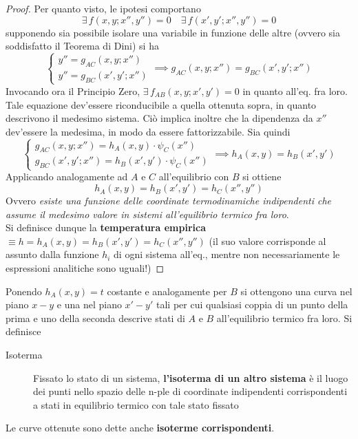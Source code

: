 \documentclass[10pt, oneside]{book}
\begin{document}
\begin{proof}
Per quanto visto, le ipotesi comportano
\[\exists \, f(x,y; x'', y'') = 0 \quad \exists \, f(x', y'; x'', y'') = 0\]
supponendo sia possibile isolare una variabile in funzione delle altre (ovvero sia soddisfatto il Teorema di Dini) si ha
\[\displaystyle \begin{cases} y'' = g_{AC} (x,y; x'') \\ y'' = g_{BC} (x', y'; x'') \end{cases} \implies g_{AC} (x,y; x'') = g_{BC} (x', y'; x'')\]
Invocando ora il Principio Zero, $\displaystyle \exists \, f_{AB}(x,y;x',y') = 0$ in 	quanto all'eq. fra loro. Tale equazione dev'essere riconducibile a quella ottenuta sopra, in quanto descrivono il medesimo sistema. Ciò implica inoltre che la dipendenza da $x''$ dev'essere la medesima, in modo da essere fattorizzabile. Sia quindi
\[\begin{cases} g_{AC} (x, y; x'') = h_A (x,y) \cdot \psi_C (x'') \\ g_{BC} (x', y'; x'') = h_B(x',y') \cdot \psi_C (x'') \end{cases} \implies h_A(x,y) = h_B(x',y')\]
Applicando analogamente ad $A$ e $C$ all'equilibrio con $B$ si ottiene
\[h_A(x,y) = h_B(x',y') = h_C (x'', y'')\]
Ovvero \textit{esiste una funzione delle coordinate termodinamiche indipendenti che assume il medesimo valore in sistemi all'equilibrio termico fra loro}.
\\Si definisce dunque la \textbf{temperatura empirica} $\displaystyle \equiv h = h_A(x,y) = h_B(x',y') = h_C (x'', y'')$ (il suo valore corrisponde al  assunto dalla funzione $h_i$ di ogni sistema all'eq., mentre non necessariamente le espressioni analitiche sono uguali!)	
\end{proof}
Ponendo $h_A(x,y) = t$ costante e analogamente per $B$ si ottengono una curva nel piano $x-y$ e una nel piano $x'-y'$ tali per cui qualsiasi coppia di un punto della prima e uno della seconda descrive stati di $A$ e $B$ all'equilibrio termico fra loro. Si definisce
\begin{description}
\item[Isoterma] Fissato lo stato di un sistema, \textbf{l'isoterma di un altro sistema} è il luogo dei punti nello spazio delle n-ple di coordinate indipendenti corrispondenti a stati in equilibrio termico con tale stato fissato
\end{description}
Le curve ottenute sono dette anche \textbf{isoterme corrispondenti}.
\end{document}

